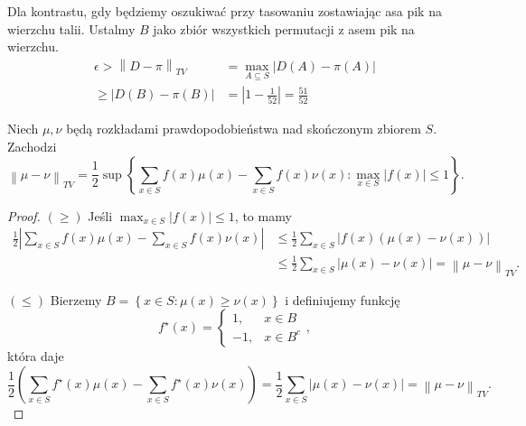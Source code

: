\begin{example}
	Dla kontrastu, gdy będziemy oszukiwać przy tasowaniu zostawiając asa pik na wierzchu talii.
	Ustalmy \(B\) jako zbiór wszystkich permutacji z asem pik na wierzchu.
	\begin{align*}
		\epsilon > \left\|D-\pi\right\|_{TV} & = \max_{A \subseteq S}\left|D(A) - \pi(A)\right| \\
		\ge \left|D(B) - \pi(B)\right|       & = \left|1 - \frac{1}{52}\right| = \frac{51}{52}
	\end{align*}
\end{example}

\begin{lemma}
	Niech \(\mu, \nu\) będą rozkładami prawdopodobieństwa nad skończonym zbiorem \(S\). Zachodzi
	\[ \left\|\mu-\nu\right\|_{TV} = \frac{1}{2} \sup \left\{ \sum_{x \in  S}^{} f\left( x  \right) \mu\left( x  \right) - \sum_{x \in  S}^{} f\left( x  \right) \nu\left( x  \right) : \max_{x \in S}\left|f\left( x  \right) \right|\le 1 \right\}  .\]
\end{lemma}
\begin{proof}
	\(\left( \ge  \right) \) Jeśli \(\max_{x \in S }\left|f\left( x  \right) \right|\le 1\), to mamy
	\begin{align*}
		\frac{1}{2} \left|\sum_{x \in  S}^{} f\left( x  \right) \mu\left( x  \right) - \sum_{x \in  S}^{} f\left( x  \right) \nu\left( x  \right) \right| & \le  \frac{1}{2} \sum_{x \in S}^{} \left|f\left( x  \right) \left( \mu\left( x  \right) - \nu\left( x  \right)  \right) \right| \\
		                                                                                                                                                  & \le  \frac{1}{2} \sum_{x \in S}^{} \left|\mu\left( x  \right) - \nu\left( x  \right) \right| = \left\|\mu-\nu\right\|_{TV}.
	\end{align*}

	\(\left( \le  \right) \) Bierzemy \(B = \left\{ x \in S : \mu\left( x  \right) \ge \nu\left( x \right)  \right\} \) i definiujemy funkcję
	\[ f^{\star}\left( x  \right)  = \left\{ \begin{array}{lr} 1, & x \in B \\ -1, & x \in B^{c} \end{array} \right. , \]
	która daje
	\[ \frac{1}{2} \left( \sum_{x \in S}^{} f^{\star}\left( x  \right) \mu\left( x  \right) - \sum_{x \in S}^{} f^{\star}\left( x  \right) \nu\left( x  \right)  \right) = \frac{1}{2} \sum_{x \in S}^{} \left|\mu\left( x  \right) - \nu\left( x  \right) \right|= \left\|\mu-\nu\right\|_{TV}. \]
\end{proof}
